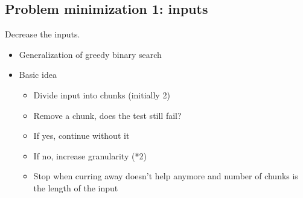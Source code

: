 \subsection{Problem minimization 1: inputs}
Decrease the inputs.

\begin{itemize}
    \item Generalization of greedy binary search
    \item Basic idea 
    \begin{itemize}
        \item Divide input into chunks (initially 2)
        \item Remove a chunk, does the test still fail?
        \item If yes, continue without it
        \item If no, increase granularity (*2)
        \item Stop when curring away doesn't help anymore and number of chunks is the length of the input
    \end{itemize}
\end{itemize}


